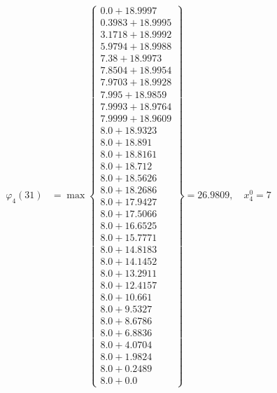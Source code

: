 \documentclass{article}
\begin{document}
\begin{align*}
  
\varphi_{4}(31) &= \max \left\{ \begin{array}{c}
0.0 + 18.9997 \\
 0.3983 + 18.9995 \\
 3.1718 + 18.9992 \\
 5.9794 + 18.9988 \\
 7.38 + 18.9973 \\
 7.8504 + 18.9954 \\
 7.9703 + 18.9928 \\
 7.995 + 18.9859 \\
 7.9993 + 18.9764 \\
 7.9999 + 18.9609 \\
 8.0 + 18.9323 \\
 8.0 + 18.891 \\
 8.0 + 18.8161 \\
 8.0 + 18.712 \\
 8.0 + 18.5626 \\
 8.0 + 18.2686 \\
 8.0 + 17.9427 \\
 8.0 + 17.5066 \\
 8.0 + 16.6525 \\
 8.0 + 15.7771 \\
 8.0 + 14.8183 \\
 8.0 + 14.1452 \\
 8.0 + 13.2911 \\
 8.0 + 12.4157 \\
 8.0 + 10.661 \\
 8.0 + 9.5327 \\
 8.0 + 8.6786 \\
 8.0 + 6.8836 \\
 8.0 + 4.0704 \\
 8.0 + 1.9824 \\
 8.0 + 0.2489 \\
 8.0 + 0.0
\end{array} \right\}=26.9809,\quad x_{4}^0=7\\
  
  
  

\end{align*}
\end{document}
